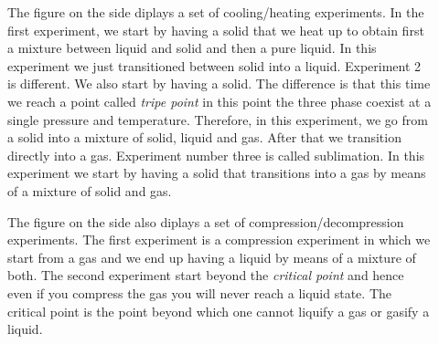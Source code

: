 \documentclass[main.tex]{subfiles}
\begin{document}
\begin{description}
\item[] The figure on the side diplays a set of cooling/heating experiments. In the first experiment, we start by having a solid that we  heat up to obtain first a mixture between liquid and solid and then a pure liquid. In this experiment we just transitioned between solid into a liquid. Experiment 2 is different. We also start by having a solid. The difference is that this time we reach a point called \emph{tripe point} in this point the three phase coexist at a single pressure and temperature. Therefore, in this experiment, we go from a solid into a mixture of solid, liquid and gas. After that we transition directly into a gas. Experiment number three is called sublimation. In this experiment we start by having a solid that transitions into a gas by means of a mixture of solid and gas. 
\item[] The figure on the side also diplays a set of compression/decompression experiments. The first experiment is a compression experiment in which we start from a gas and we end up having a liquid by means of a mixture of both. The second experiment start beyond the \emph{critical point} and hence even if you compress the gas you will never reach a liquid state. The critical point is the point beyond which one cannot liquify a gas or gasify a liquid.


\begin{marginfigure}[-2cm]


\end{marginfigure}
\end{description}
\end{document}

